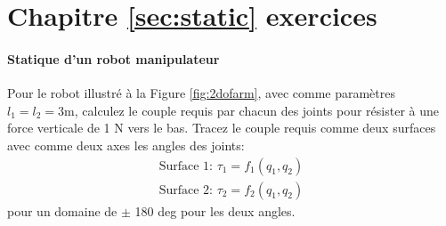 \chapter{Chapitre \ref{sec:static} exercices}
\label{sec:exer_static}

\subsubsection{Statique d'un robot manipulateur}

Pour le robot illustré à la Figure \ref{fig:2dofarm}, avec comme paramètres $l_1=l_2=3$m, calculez le couple requis par chacun des joints pour résister à une force verticale de 1 N vers le bas. Tracez le couple requis comme deux surfaces avec comme deux axes les angles des joints:
\begin{align}
    \text{Surface 1:  } \tau_1 = f_1( q_1 , q_2 ) \\
    \text{Surface 2:  } \tau_2 = f_2( q_1 , q_2 )
\end{align}
pour un domaine de $\pm$ 180 deg pour les deux angles.